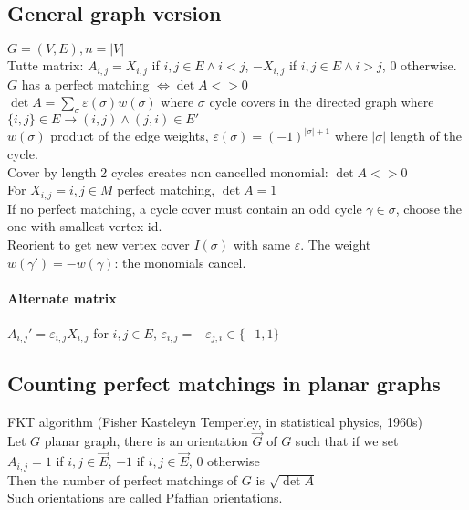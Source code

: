 \documentclass[12pt]{article}
\begin{document}
\subsection{General graph version}
$G=(V,E), n = |V|$\\
Tutte matrix: $A_{i,j} = X_{i,j}$ if $i,j \in E \wedge i < j$, $-X_{i,j}$ if $i,j \in E \wedge i > j$, $0$ otherwise.\\
$G$ has a perfect matching $\Leftrightarrow \det A <> 0$\\
$\det A = \sum_{\sigma} \varepsilon(\sigma) w(\sigma)$ where $\sigma$ cycle covers in the directed graph where $\{i,j\} \in E \rightarrow (i,j) \wedge (j, i) \in E'$\\
$w(\sigma)$ product of the edge weights, $\varepsilon(\sigma) = (-1)^{|\sigma|+1}$ where $|\sigma|$ length of the cycle.\\
Cover by length 2 cycles creates non cancelled monomial: $\det A <> 0$\\
For $X_{i,j} = i,j \in M$ perfect matching, $\det A = 1$\\
If no perfect matching, a cycle cover must contain an odd cycle $\gamma \in \sigma$, choose the one with smallest vertex id.\\
Reorient to get new vertex cover $I(\sigma)$ with same $\varepsilon$. The weight $w(\gamma') = -w(\gamma)$: the monomials cancel.\\

\paragraph{Alternate matrix\\}
$A_{i,j}' = \varepsilon_{i,j} X_{i,j}$ for $i,j \in E$, $\varepsilon_{i,j} = - \varepsilon_{j,i} \in \{-1,1\}$\\

\subsection{Counting perfect matchings in planar graphs}
FKT algorithm (Fisher Kasteleyn Temperley, in statistical physics, 1960s)\\
Let $G$ planar graph, there is an orientation $\overrightarrow{G}$ of $G$ such that if we set\\
$A_{i,j} = 1$ if $i,j \in \overrightarrow{E}$, $-1$ if $i,j \in \overrightarrow{E}$, $0$ otherwise\\
Then the number of perfect matchings of $G$ is $\sqrt{\det A}$\\
Such orientations are called Pfaffian orientations.\\
\end{document}
